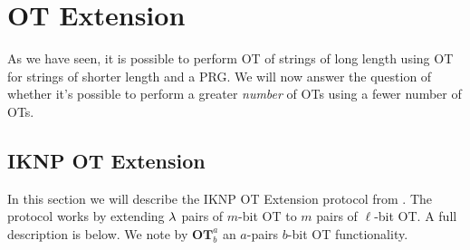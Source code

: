 \section{OT Extension}

As we have seen, it is possible to perform OT of strings of long length using OT for strings of shorter length and a PRG. We will now answer the question of whether it's possible to perform a greater \textit{number} of OTs using a fewer number of OTs.

\subsection{IKNP OT Extension} 

In this section we will describe the IKNP OT Extension protocol from \cite{iknp}. The protocol works by extending $\lambda$ pairs of $m$-bit OT to $m$ pairs of $\ell$-bit OT. A full description is below. We note by $\mathbf{OT}^{a}_{b}$ an $a$-pairs $b$-bit OT functionality.

